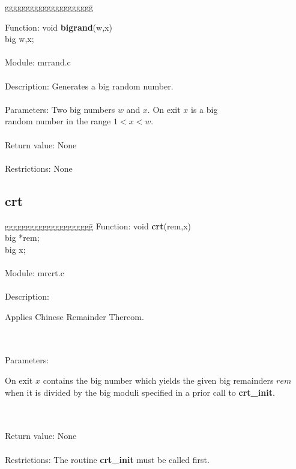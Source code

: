 \begin{tabbing}
ggggggggggggggggggggg\= \kill

      Function:      \>void {\bf bigrand}(w,x)  \\
                     \>big w,x;  \\
      \ \\
      Module:        \>mrrand.c  \\
      \ \\
      Description:   \>Generates a big random number. \\
      \ \\
      Parameters:    \>Two big numbers $w$ and $x$. On exit $x$ is a big \\
                     \>random number in the range $1<x<w$. \\
      \ \\
      Return value:  \>None \\
      \ \\
      Restrictions:  \>None \\

\end{tabbing}
\pagebreak
\subsection{crt}
\begin{tabbing}
ggggggggggggggggggggg\= \kill
      Function:      \>void {\bf crt}(rem,x) \\
                     \>big *rem; \\
                     \>big x; \\
      \ \\
      Module:        \>mrcrt.c \\
      \ \\
      Description:   \>
                     \parbox[t]{3 in}
                     {Applies Chinese Remainder Thereom.} \\
      \ \\
      Parameters:    \>
                     \parbox[t]{3 in}
                     {On exit $x$ contains the big number which yields 
                     the given big remainders $rem$ when it is divided by the 
                     big moduli
                     specified in a prior call to {\bf crt\_init}.} \\
      \ \\
      Return value:  \>None \\
      \ \\
      Restrictions:  \>The routine {\bf crt\_init} must be called first. \\
\end{tabbing}

